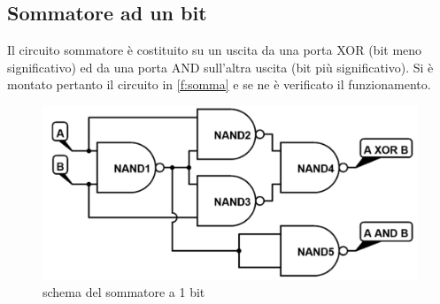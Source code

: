 \subsection{Sommatore ad un bit}
Il circuito sommatore è costituito su un uscita da una porta XOR (bit meno significativo) ed da una porta AND sull'altra uscita (bit più significativo). Si è montato pertanto il circuito in \figurename{ \ref{f:somma}} e se ne è verificato il funzionamento.
\begin{figure}[H]
	\centering
	\includegraphics[scale=0.3]{../Figs-Tabs/SUM_.png}
	\caption{schema del sommatore a 1 bit}
\end{figure}\label{f:somma}
